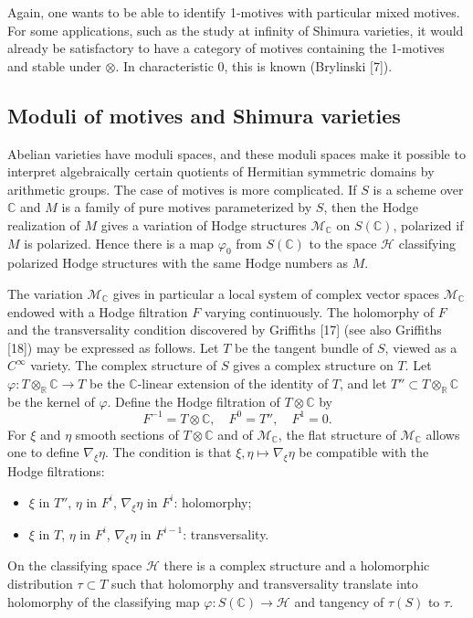 \documentclass[11pt,a4paper]{article}
\theoremstyle{plain}
\theoremstyle{definition}
\newcommand{\C}{\mathbb{C}}
\newcommand{\R}{\mathbb{R}}
\begin{document}
Again, one wants to be able to identify 1-motives with particular mixed motives. For some applications, such as the study at infinity of Shimura varieties, it would already be satisfactory to have a category of motives containing the 1-motives and stable under $\otimes$. In characteristic $0$, this is known (Brylinski [7]).

\subsection{Moduli of motives and Shimura varieties}

Abelian varieties have moduli spaces, and these moduli spaces make it possible to interpret algebraically certain quotients of Hermitian symmetric domains by arithmetic groups. The case of motives is more complicated. If $S$ is a scheme over $\C$ and $M$ is a family of pure motives parameterized by $S$, then the Hodge realization of $M$ gives a variation of Hodge structures $\mathcal{M}_{\C}$ on $S(\C)$, polarized if $M$ is polarized. Hence there is a map $\varphi_0$ from $S(\C)$ to the space $\mathscr{H}$ classifying polarized Hodge structures with the same Hodge numbers as $M$.

The variation $\mathcal{M}_{\C}$ gives in particular a local system of complex vector spaces $\mathcal{M}_{\C}$ endowed with a Hodge filtration $F$ varying continuously. The holomorphy of $F$ and the transversality condition discovered by Griffiths [17] (see also Griffiths [18]) may be expressed as follows. Let $T$ be the tangent bundle of $S$, viewed as a $C^\infty$ variety. The complex structure of $S$ gives a complex structure on $T$. Let $\varphi:T\otimes_{\R}\C\to T$ be the $\C$-linear extension of the identity of $T$, and let $T''\subset T\otimes_{\R}\C$ be the kernel of $\varphi$. Define the Hodge filtration of $T\otimes\C$ by
$$
F^{-1}=T\otimes\C,\quad F^0=T'',\quad F^1=0.
$$
For $\xi$ and $\eta$ smooth sections of $T\otimes\C$ and of $\mathcal{M}_{\C}$, the flat structure of $\mathcal{M}_{\C}$ allows one to define $\nabla_\xi\eta$. The condition is that $\xi,\eta\mapsto\nabla_\xi\eta$ be compatible with the Hodge filtrations:
\begin{itemize}
\item[] $\xi$ in $T''$, $\eta$ in $F^i$, $\nabla_\xi\eta$ in $F^i$: holomorphy;
\item[] $\xi$ in $T$, $\eta$ in $F^i$, $\nabla_\xi\eta$ in $F^{i-1}$: transversality.
\end{itemize}

On the classifying space $\mathscr{H}$ there is a complex structure and a holomorphic distribution $\tau\subset T$ such that holomorphy and transversality translate into holomorphy of the classifying map $\varphi:S(\C)\to\mathscr{H}$ and tangency of $\tau(S)$ to $\tau$.
\end{document}

